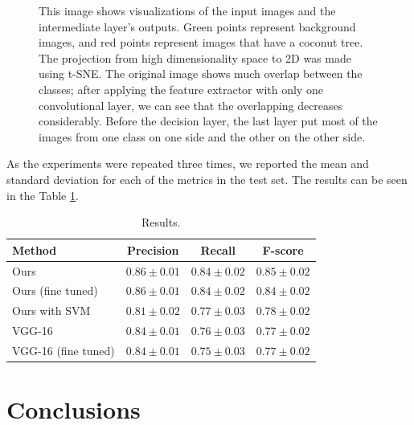 \documentclass[a4paper,conference]{IEEEtran}
\begin{document}
\begin{figure}
{  \label{fig:vis-classifier}}
  \caption{This image shows visualizations of the input images and the intermediate layer's outputs. Green points represent background images, and red points represent images that have a coconut tree. The projection from high dimensionality space to 2D was made using t-SNE. The original image shows much overlap between the classes; after applying the feature extractor with only one convolutional layer, we can see that the overlapping decreases considerably. Before the decision layer, the last layer put most of the images from one class on one side and the other on the other side.}
\end{figure}

As the experiments were repeated three times, we reported the mean and standard deviation for each of the metrics in the test set. The results can be seen in the Table \ref{tab:results}.

\begin{table}[!t]
  \begin{center}
  \begin{tabular}{|l|c|c|c|}
  \hline
   Method & Precision & Recall & F-score \\
  \hline\hline
    Ours & $\boldsymbol{0.86 \pm 0.01}$ & $0.84 \pm 0.02$ & $0.85 \pm 0.02$\\
  Ours (fine tuned) & $0.86 \pm 0.01$ & $0.84 \pm 0.02$ & $0.84 \pm 0.02$\\
  Ours with SVM & $0.81 \pm 0.02$ & $0.77 \pm 0.03$ & $0.78 \pm 0.02$\\
  VGG-16 & $0.84 \pm 0.01$ & $0.76 \pm 0.03$ & $0.77 \pm 0.02 $ \\
  VGG-16 (fine tuned) & $0.84 \pm 0.01$ & $0.75 \pm 0.03$ & $0.77 \pm 0.02 $ \\
  \hline
  \end{tabular}
  \end{center}
  \caption{Results.}
  \label{tab:results}
\end{table}

\section{Conclusions}



\end{document}
